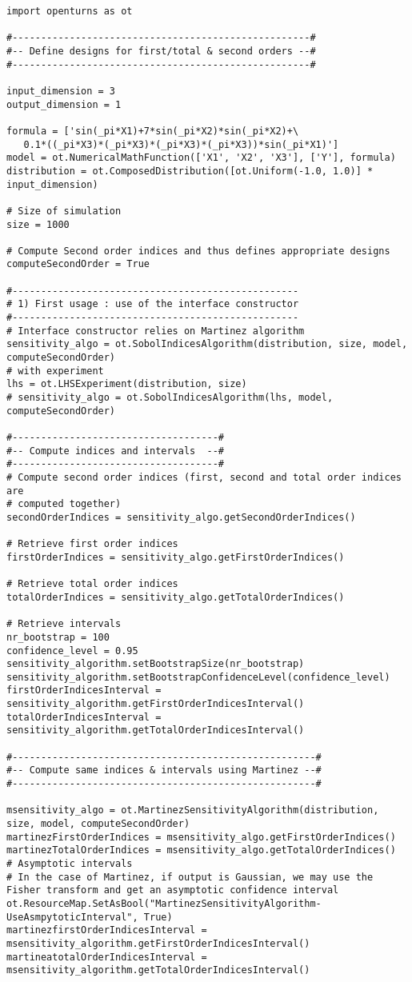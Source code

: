 \begin{lstlisting}
import openturns as ot

#----------------------------------------------------#
#-- Define designs for first/total & second orders --#
#----------------------------------------------------#

input_dimension = 3
output_dimension = 1

formula = ['sin(_pi*X1)+7*sin(_pi*X2)*sin(_pi*X2)+\
   0.1*((_pi*X3)*(_pi*X3)*(_pi*X3)*(_pi*X3))*sin(_pi*X1)']
model = ot.NumericalMathFunction(['X1', 'X2', 'X3'], ['Y'], formula)
distribution = ot.ComposedDistribution([ot.Uniform(-1.0, 1.0)] * input_dimension)

# Size of simulation
size = 1000

# Compute Second order indices and thus defines appropriate designs
computeSecondOrder = True

#--------------------------------------------------
# 1) First usage : use of the interface constructor
#--------------------------------------------------
# Interface constructor relies on Martinez algorithm
sensitivity_algo = ot.SobolIndicesAlgorithm(distribution, size, model, computeSecondOrder)
# with experiment
lhs = ot.LHSExperiment(distribution, size)
# sensitivity_algo = ot.SobolIndicesAlgorithm(lhs, model, computeSecondOrder)

#------------------------------------#
#-- Compute indices and intervals  --#
#------------------------------------#
# Compute second order indices (first, second and total order indices are
# computed together)
secondOrderIndices = sensitivity_algo.getSecondOrderIndices()

# Retrieve first order indices
firstOrderIndices = sensitivity_algo.getFirstOrderIndices()

# Retrieve total order indices
totalOrderIndices = sensitivity_algo.getTotalOrderIndices()

# Retrieve intervals
nr_bootstrap = 100
confidence_level = 0.95
sensitivity_algorithm.setBootstrapSize(nr_bootstrap)
sensitivity_algorithm.setBootstrapConfidenceLevel(confidence_level)
firstOrderIndicesInterval = sensitivity_algorithm.getFirstOrderIndicesInterval()
totalOrderIndicesInterval = sensitivity_algorithm.getTotalOrderIndicesInterval()

#-----------------------------------------------------#
#-- Compute same indices & intervals using Martinez --#
#-----------------------------------------------------#

msensitivity_algo = ot.MartinezSensitivityAlgorithm(distribution, size, model, computeSecondOrder)
martinezFirstOrderIndices = msensitivity_algo.getFirstOrderIndices()
martinezTotalOrderIndices = msensitivity_algo.getTotalOrderIndices()
# Asymptotic intervals
# In the case of Martinez, if output is Gaussian, we may use the Fisher transform and get an asymptotic confidence interval
ot.ResourceMap.SetAsBool("MartinezSensitivityAlgorithm-UseAsmpytoticInterval", True)
martinezfirstOrderIndicesInterval = msensitivity_algorithm.getFirstOrderIndicesInterval()
martineatotalOrderIndicesInterval = msensitivity_algorithm.getTotalOrderIndicesInterval()


\end{lstlisting}
